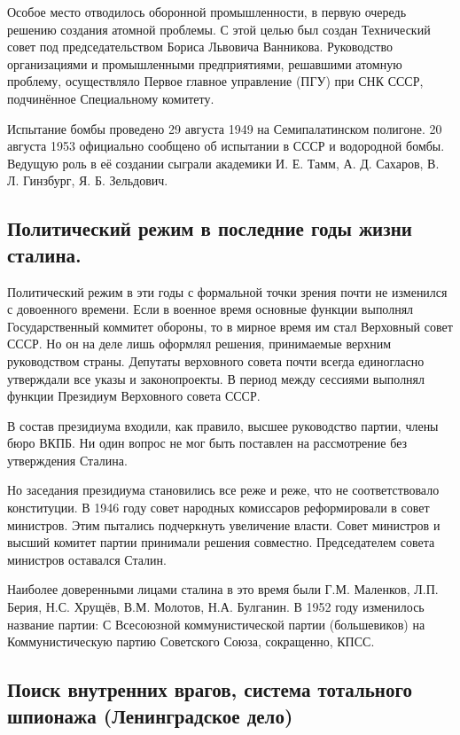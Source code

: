 Особое место отводилось оборонной промышленности, в первую очередь решению создания атомной проблемы. С этой целью был создан Технический совет под председательством Бориса Львовича Ванникова. Руководство организациями и промышленными предприятиями, решавшими атомную проблему, осуществляло Первое главное управление (ПГУ) при СНК СССР, подчинённое Специальному комитету.  

Испытание бомбы проведено 29 августа 1949 на Семипалатинском полигоне. 20 августа 1953 официально сообщено об испытании в СССР и водородной бомбы. Ведущую роль в её создании сыграли академики И. Е. Тамм, А. Д. Сахаров, В. Л. Гинзбург, Я. Б. Зельдович.

\subsection{Политический режим в последние годы жизни сталина.}

Политический режим в эти годы с формальной точки зрения почти не изменился с довоенного времени. Если в военное время основные функции выполнял Государственный коммитет обороны, то в мирное время им стал Верховный совет СССР. Но он на деле лишь оформлял решения, принимаемые верхним руководством страны. Депутаты верховного совета почти всегда единогласно утверждали все указы и законопроекты. В период между сессиями выполнял функции Президиум Верховного совета СССР. 

В состав президиума входили, как правило, высшее руководство партии, члены бюро ВКПБ. Ни один вопрос не мог быть поставлен на рассмотрение без утверждения Сталина.

Но заседания президиума становились все реже и реже, что не соответствовало конституции. В 1946 году совет народных комиссаров реформировали в совет министров. Этим пытались подчеркнуть увеличение власти. Совет министров и высший комитет партии принимали решения совместно. Председателем совета министров оставался Сталин.

Наиболее доверенными лицами сталина в это время были Г.М. Маленков, Л.П. Берия, Н.С. Хрущёв, В.М. Молотов, Н.А. Булганин.
В 1952 году изменилось название партии: С Всесоюзной коммунистической партии (большевиков) на Коммунистическую партию Советского Союза, сокращенно, КПСС. 

\subsection{Поиск внутренних врагов, система тотального шпионажа (Ленинградское дело)}

